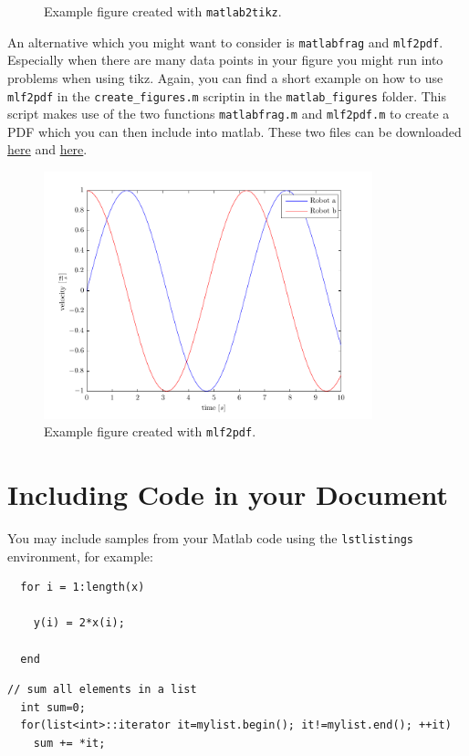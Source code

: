 \begin{figure}[H]
  \centering
  \setlength\fwidth{8.0cm}
  \setlength\fheight{6.0cm}
  
  \caption{Example figure created with \texttt{matlab2tikz}.}
  \label{fig:example_tikz_figure}
\end{figure}

An alternative which you might want to consider is \texttt{matlabfrag} and \texttt{mlf2pdf}.
Especially when there are many data points in your figure you might run into problems when using tikz.
Again, you can find a short example on how to use \texttt{mlf2pdf} in the \texttt{create\_figures.m} scriptin in the \texttt{matlab\_figures} folder.
This script makes use of the two functions \texttt{matlabfrag.m} and \texttt{mlf2pdf.m} to create a PDF which you can then include into matlab.
These two files can be downloaded \href{http://www.mathworks.ch/matlabcentral/fileexchange/28545-matlabfrag-to-pdf}{here} and \href{http://www.mathworks.ch/matlabcentral/fileexchange/21286-matlabfrag}{here}.

\begin{figure}[H]
     \centering
     \includegraphics[width=0.85\textwidth]{matlab_figures/example_matlabfrag_figure.pdf}
     \caption{Example figure created with \texttt{mlf2pdf}.}
     \label{fig:example_matlab_fig}
  \end{figure}


\section{Including Code in your Document}

You may include samples from your Matlab code using the \texttt{lstlistings} environment, for example:

  \lstset{language=Matlab,numbers=none}
  \begin{lstlisting}[frame=lines, caption=Matlab Example, label=matlabexample]
  % Evaluate y = 2x
  for i = 1:length(x)

    y(i) = 2*x(i);

  end
  \end{lstlisting}

  \lstset{language=C++,numbers=none,caption=C++ Example, label=cppexample}
  \begin{lstlisting}[frame=lines]
  // sum all elements in a list
  int sum=0;
  for(list<int>::iterator it=mylist.begin(); it!=mylist.end(); ++it)
    sum += *it;
  \end{lstlisting}
